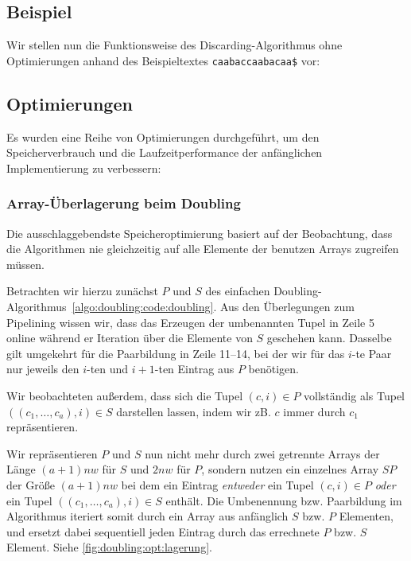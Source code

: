 \subsection{Beispiel}

Wir stellen nun die Funktionsweise des Discarding-Algorithmus ohne Optimierungen anhand des Beispieltextes \texttt{caabaccaabacaa\$} vor:



\subsection{Optimierungen}
\label{algo:doubling:sec:usedoptimizations}

Es wurden eine Reihe von Optimierungen durchgeführt, um den Speicherverbrauch und die Laufzeitperformance der anfänglichen Implementierung zu verbessern:

\subsubsection{Array-Überlagerung beim Doubling} Die ausschlaggebendste Speicheroptimierung basiert auf der Beobachtung, dass die Algorithmen nie gleichzeitig auf alle Elemente der benutzen Arrays zugreifen müssen.

Betrachten wir hierzu zunächst $P$ und $S$ des einfachen Doubling-Algorithmus~\ref{algo:doubling:code:doubling}. Aus den Überlegungen zum Pipelining wissen wir, dass das Erzeugen der umbenannten Tupel in Zeile 5 online während er Iteration über die Elemente von $S$ geschehen kann. Dasselbe gilt umgekehrt für die Paarbildung in Zeile 11--14, bei der wir für das $i$-te Paar nur jeweils den $i$-ten und $i+1$-ten Eintrag aus $P$ benötigen. 

Wir beobachteten außerdem, dass sich die Tupel $(c, i) \in P$ vollständig als Tupel $((c_1, \dots, c_a), i) \in S$ darstellen lassen, indem wir zB. $c$ immer durch $c_1$ repräsentieren.

Wir repräsentieren $P$ und $S$ nun nicht mehr durch zwei getrennte Arrays der Länge $(a + 1)nw$ für $S$ und $2nw$ für $P$, sondern nutzen ein einzelnes Array $SP$ der Größe $(a + 1)nw$  bei dem ein Eintrag \textit{entweder} ein Tupel $(c, i) \in P$ \textit{oder} ein Tupel $((c_1, \dots, c_a), i) \in S$ enthält. Die Umbenennung bzw. Paarbildung im Algorithmus iteriert somit durch ein Array aus anfänglich $S$ bzw. $P$ Elementen, und ersetzt dabei sequentiell jeden Eintrag durch das errechnete $P$ bzw. $S$ Element. Siehe \cref{fig:doubling:opt:lagerung}.

